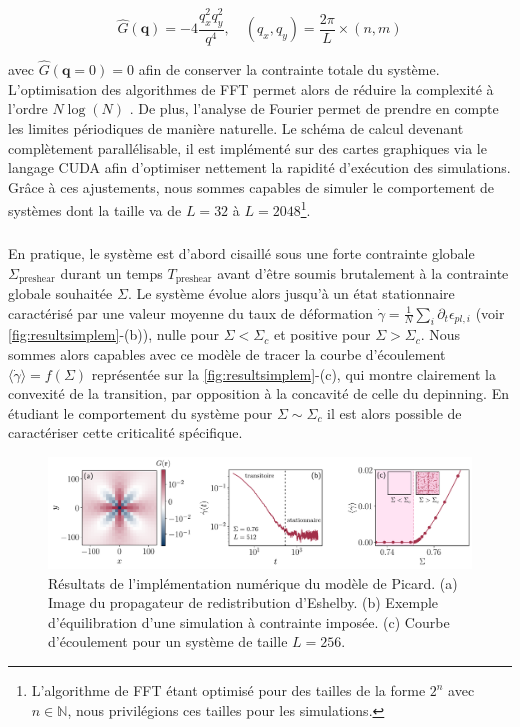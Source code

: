 \begin{equation}
	\hat{G}(\mathbf{q}) = -4\frac{q_x^2 q_y^2}{q^4}, \quad (q_x, q_y) = \frac{2\pi}{L} \times (n,m)
	\label{eq:eshelbydiscretfourier}
\end{equation}

\noindent avec $\hat{G}(\mathbf{q}=0) = 0$ afin de conserver la contrainte totale du système. L'optimisation des algorithmes de FFT permet alors de réduire la complexité à l'ordre $N\log(N)$ \cite{cooley_algorithm_1965}. De plus, l'analyse de Fourier permet de prendre en compte les limites périodiques de manière naturelle. Le schéma de calcul devenant complètement parallélisable, il est implémenté sur des cartes graphiques via le langage CUDA \cite{cuda} afin d'optimiser nettement la rapidité d'exécution des simulations. Grâce à ces ajustements, nous sommes capables de simuler le comportement de systèmes dont la taille va de $L=32$ à $L=2048$\footnote{L'algorithme de FFT étant optimisé pour des tailles de la forme $2^n$ avec $n\in\mathbb{N}$, nous privilégions ces tailles pour les simulations.}.

\subparagraph{}En pratique, le système est d'abord cisaillé sous une forte contrainte globale $\Sigma_\text{preshear}$ durant un temps $T_\text{preshear}$ avant d'être soumis brutalement à la contrainte globale souhaitée $\Sigma$. Le système évolue alors jusqu'à un état stationnaire caractérisé par une valeur moyenne du taux de déformation $ \dot{\gamma}  = \frac{1}{N}\sum_{i}\partial_t\epsilon_{pl,i}$ (voir \autoref{fig:resultsimplem}-(b)), nulle pour $\Sigma<\Sigma_c$ et positive pour $\Sigma>\Sigma_c$. Nous sommes alors capables avec ce modèle de tracer la courbe d'écoulement $\langle \dot{\gamma} \rangle = f(\Sigma)$ représentée sur la \autoref{fig:resultsimplem}-(c), qui montre clairement la convexité de la transition, par opposition à la concavité de celle du depinning. En étudiant le comportement du système pour $\Sigma \sim \Sigma_c$ il est alors possible de caractériser cette criticalité spécifique.

\begin{figure}[h]
	\centering
	\includegraphics[width=\textwidth]{Chapitre4/Figures/Methode/ModeleResults.pdf}
	\caption{Résultats de l'implémentation numérique du modèle de Picard. (a) Image du propagateur de redistribution d'Eshelby. (b) Exemple d'équilibration d'une simulation à contrainte imposée. (c) Courbe d'écoulement pour un système de taille $L=256$.}
	\label{fig:resultsimplem}
\end{figure}

